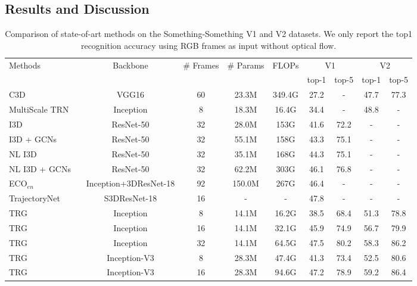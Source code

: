 \documentclass[conference,compsoc]{IEEEtran}
\begin{document}
    
\subsection{Results and Discussion}

    \begin{table*}[!htb]
\caption{Comparison of state-of-art methods on the Something-Something V1 and V2 datasets. We only report the top1 recognition accuracy using RGB frames as input without optical flow.}
        \begin{center}
        \begin{tabular}{lcccccccc}
        \toprule
         \multirow{2}{*}{Methods} & \multirow{2}{*}{Backbone}&  \multirow{2}{*}{\# Frames}& \multirow{2}{*}{\# Params}& \multirow{2}{*}{FLOPs}& \multicolumn{2}{c}{V1} & \multicolumn{2}{c}{V2}\\
         & & & & & top-1 & top-5 & top-1 & top-5\\
         \midrule
         C3D \cite{goyal2017something} ~ & VGG16 & 60 & 23.3M & 349.4G & 27.2 & - & 47.7 & 77.3\\
         MultiScale TRN \cite{zhou2018temporal} ~& Inception & 8 & 18.3M & 16.4G & 34.4 &- & 48.8 &- \\
         I3D~\cite{wang2018videos} & ResNet-50 & 32 & 28.0M & 153G & 41.6 & 72.2 & - & -  \\
         I3D + GCNs \cite{wang2018videos}  ~& ResNet-50 & 32 & 55.1M & 158G & 43.3 &  75.1 &- &-  \\
         NL I3D \cite{wang2018videos}  ~& ResNet-50 & 32 & 35.1M & 168G & 44.3 &  75.1 &- &-  \\
         NL I3D + GCNs \cite{wang2018videos}  ~& ResNet-50 & 32 & 62.2M & 303G & 46.1 &  76.8 &- &-  \\
         ECO$_{en}$ \cite{zolfaghari2018eco:} ~& Inception+3DResNet-18 & 92 & 150.0M & 267G & 46.4 & - &- &- \\
         TrajectoryNet \cite{zhao2018trajectory} ~ & S3DResNet-18 & 16 & - & - & 47.8 & - &- &-\\ \hline
         TRG~ & Inception & 8 & 14.1M & 16.2G & 38.5 & 68.4 & 51.3 &78.8 \\
         TRG~ & Inception & 16 & 14.1M & 32.1G & 45.9 & 74.9 & 56.7 &79.9 \\
         TRG~ & Inception & 32 & 14.1M & 64.5G &  47.5 & 80.2 & 58.3 & 86.2 \\
         TRG~ & Inception-V3 & 8 & 28.3M & 47.4G & 41.3 & 73.4 & 52.5 & 80.6 \\
         TRG~ & Inception-V3 & 16 & 28.3M & 94.6G & 47.2 & 78.9 & 59.2 & 86.4 \\

\end{tabular}
\end{center}
\end{table*}
\end{document}
